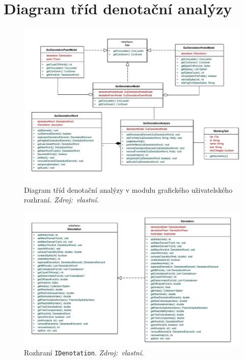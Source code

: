 \documentclass[dp.tex]{subfiles}
\begin{document}
\chapter{Diagram tříd denotační analýzy}
\label{appendix:class-diagram}

\begin{figure}[H]
	\centering
	\includegraphics[max width=\textwidth,keepaspectratio=true]{imgs-60-aplikace/gui-denotation-class-diagram}
	\caption[]{Diagram tříd denotační analýzy v modulu grafického uživatelského rozhraní. \textit{Zdroj:~vlastní.}}
	\label{fig:gui-denotation-class-diagram}
\end{figure}


\newpage
\begin{figure}[H]
	\centering
	\includegraphics[max width=\textwidth,keepaspectratio=true]{imgs-60-aplikace/compLing-IDenotationInterface-class-diagram}
	\caption[]{Rozhraní \texttt{IDenotation}. \textit{Zdroj:~vlastní.}}
	\label{fig:gui-idenotation-class-diagram}
\end{figure}
\end{document}
